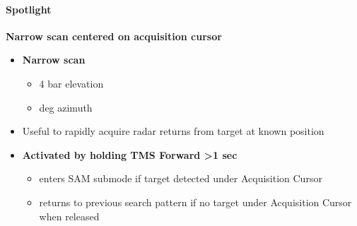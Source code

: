 \paragraph{Spotlight}
\textbf{Narrow scan centered on acquisition cursor}
\begin{itemize}
    \item \textbf{Narrow scan}
    \begin{itemize}
        \item 4 bar elevation 
        \item {} deg azimuth
    \end{itemize}
    \item Useful to rapidly acquire radar returns from target at known position
    \item \textbf{Activated by holding TMS Forward >1 sec}
    \begin{itemize}
        \item enters SAM submode if target detected under Acquisition Cursor
        \item returns to previous search pattern if no target under Acquisition Cursor when released
    \end{itemize}
\end{itemize}

